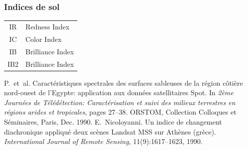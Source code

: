\documentclass[compress]{beamer}
\begin{document}
\begin{frame}
\frametitle{Indices de sol}
\footnotesize \centering
\begin{tabular}{|c|l|}
\hline
IR  & Redness Index  \cite{Pouget1990-IRIC} \\
IC  & Color Index  \cite{Pouget1990-IRIC} \\
IB  & Brilliance Index  \cite{Nicoloyanni1990-IB} \\
IB2 & Brilliance Index  \cite{Nicoloyanni1990-IB} \\
\hline
\end{tabular}
\begin{thebibliography}{noidea}
\tiny
{}
P.~et~al.
 Caractéristiques spectrales des surfaces sableuses de la région
  côtière nord-ouest de l'{E}gypte: application aux données satellitaires
  {S}pot.
 In {\em 2ème Journées de Télédétection: Caractérisation et suivi des
  milieux terrestres en régions arides et tropicales}, pages 27--38. ORSTOM,
  Collection Colloques et Séminaires, Paris, Dec. 1990.
E.~Nicoloyanni.
 Un indice de changement diachronique appliqu\'e deux sc\`enes
  {L}andsat {MSS} sur {A}th\`enes (gr\`ece).
 {\em International Journal of Remote Sensing}, 11(9):1617--1623,
  1990.
\end{thebibliography}
\end{frame}
\end{document}
